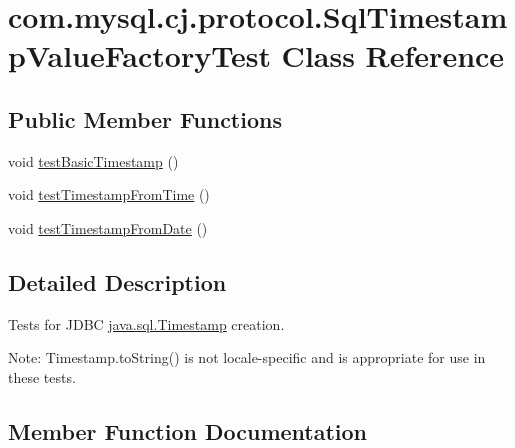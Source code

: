 \hypertarget{classcom_1_1mysql_1_1cj_1_1protocol_1_1_sql_timestamp_value_factory_test}{}\section{com.\+mysql.\+cj.\+protocol.\+Sql\+Timestamp\+Value\+Factory\+Test Class Reference}
\label{classcom_1_1mysql_1_1cj_1_1protocol_1_1_sql_timestamp_value_factory_test}
\subsection*{Public Member Functions}
\begin{DoxyCompactItemize}
\item 
void \mbox{\hyperlink{classcom_1_1mysql_1_1cj_1_1protocol_1_1_sql_timestamp_value_factory_test_af3dc0852a4c5b40e00a9c3012c4cc6d2}{test\+Basic\+Timestamp}} ()
\item 
void \mbox{\hyperlink{classcom_1_1mysql_1_1cj_1_1protocol_1_1_sql_timestamp_value_factory_test_af0a7b6505656f7c53014d514682a37a3}{test\+Timestamp\+From\+Time}} ()
\item 
void \mbox{\hyperlink{classcom_1_1mysql_1_1cj_1_1protocol_1_1_sql_timestamp_value_factory_test_a0150a88fa0b8af0a46ef34bef7b269d8}{test\+Timestamp\+From\+Date}} ()
\end{DoxyCompactItemize}


\subsection{Detailed Description}
Tests for J\+D\+BC \mbox{\hyperlink{}{java.\+sql.\+Timestamp}} creation. 

Note\+: Timestamp.\+to\+String() is not locale-\/specific and is appropriate for use in these tests. 

\subsection{Member Function Documentation}
\mbox{\label{classcom_1_1mysql_1_1cj_1_1protocol_1_1_sql_timestamp_value_factory_test_af3dc0852a4c5b40e00a9c3012c4cc6d2}} 
